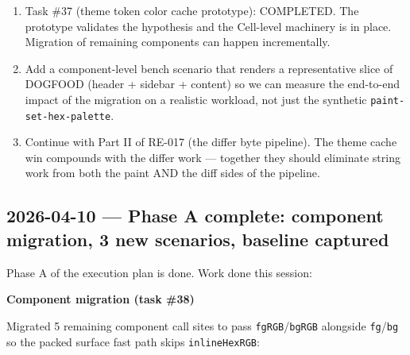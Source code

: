 \begin{enumerate}
\def\labelenumi{\arabic{enumi}.}
\tightlist
\item
  Task \#37 (theme token color cache prototype): COMPLETED. The prototype validates the hypothesis and the Cell-level machinery is in place. Migration of remaining components can happen incrementally.
\item
  Add a component-level bench scenario that renders a representative slice of DOGFOOD (header + sidebar + content) so we can measure the end-to-end impact of the migration on a realistic workload, not just the synthetic \texttt{p\allowbreak{}a\allowbreak{}i\allowbreak{}n\allowbreak{}t\allowbreak{}-\allowbreak{}s\allowbreak{}e\allowbreak{}t\allowbreak{}-\allowbreak{}h\allowbreak{}e\allowbreak{}x\allowbreak{}-\allowbreak{}p\allowbreak{}a\allowbreak{}l\allowbreak{}e\allowbreak{}t\allowbreak{}t\allowbreak{}e}.
\item
  Continue with Part II of RE-017 (the differ byte pipeline). The theme cache win compounds with the differ work --- together they should eliminate string work from both the paint AND the diff sides of the pipeline.
\end{enumerate}

\subsection{2026-04-10 --- Phase A complete: component migration, 3 new scenarios, baseline captured}\label{record-422-phase-a-complete-component-migration-3-new-scenarios-baseline-captured}

Phase A of the execution plan is done. Work done this session:

\textbf{Component migration (task \#38)}

Migrated 5 remaining component call sites to pass \texttt{f\allowbreak{}g\allowbreak{}R\allowbreak{}G\allowbreak{}B}/\texttt{b\allowbreak{}g\allowbreak{}R\allowbreak{}G\allowbreak{}B} alongside \texttt{f\allowbreak{}g}/\texttt{b\allowbreak{}g} so the packed surface fast path skips \texttt{i\allowbreak{}n\allowbreak{}l\allowbreak{}i\allowbreak{}n\allowbreak{}e\allowbreak{}H\allowbreak{}e\allowbreak{}x\allowbreak{}R\allowbreak{}G\allowbreak{}B}:

